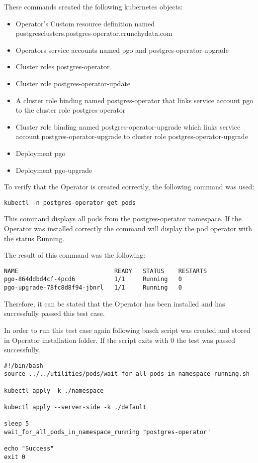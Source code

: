 These commands created the following kubernetes objects:
\begin{itemize}
  \item Operator's Custom resource definition named \\postgresclusters.postgres-operator.crunchydata.com
  \item Operators service accounts named pgo and postgres-operator-upgrade
  \item Cluster roles postgres-operator
  \item Cluster role postgres-operator-update
  \item A cluster role binding named postgres-operator that links service account pgo to the cluster role postgres-operator
  \item Cluster role binding named postgres-operator-upgrade which links service account postgres-operator-upgrade to cluster role postgres-operator-upgrade
  \item Deployment pgo
  \item Deployment pgo-upgrade
\end{itemize}


To verify that the Operator is created correctly, the following command was used:
\begin{verbatim}
kubectl -n postgres-operator get pods
\end{verbatim}

This command displays all pods from the postgres-operator namespace. If the Operator was installed correctly the command will display the pod operator with the status Running.

The result of this command was the following:
\begin{verbatim}
NAME                           READY   STATUS    RESTARTS
pgo-864ddbd4cf-4pcd6           1/1     Running   0
pgo-upgrade-78fc8d8f94-jbnrl   1/1     Running   0 
\end{verbatim}

Therefore, it can be stated that the Operator has been installed and has successfully passed this test case.

In order to run this test case again following basch script was created and stored in Operator installation folder. If the script exits with 0 the test was passed successfully.

\begin{verbatim}
#!/bin/bash
source ../../utilities/pods/wait_for_all_pods_in_namespace_running.sh

kubectl apply -k ./namespace

kubectl apply --server-side -k ./default

sleep 5
wait_for_all_pods_in_namespace_running "postgres-operator"

echo "Success"
exit 0
\end{verbatim}


